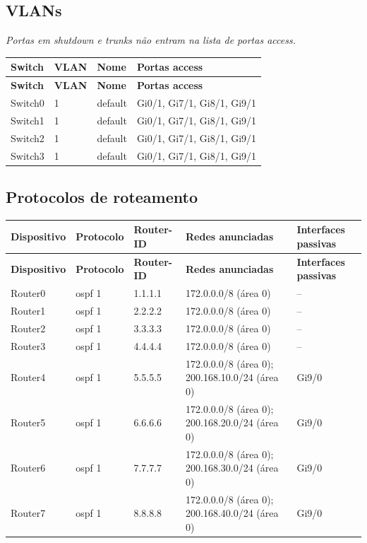 \subsection{VLANs}
\noindent\textit{Portas em shutdown e trunks não entram na lista de portas access.}\par\smallskip
\begingroup\scriptsize\setlength{\tabcolsep}{3pt}
\begin{longtable}{@{}p{}p{}p{}p{}@{}}
\toprule \textbf{Switch} & \textbf{VLAN} & \textbf{Nome} & \textbf{Portas access} \\\midrule\endfirsthead
\toprule \textbf{Switch} & \textbf{VLAN} & \textbf{Nome} & \textbf{Portas access} \\\midrule\endhead
Switch0 & 1 & default & Gi0/1, Gi7/1, Gi8/1, Gi9/1 \\
Switch1 & 1 & default & Gi0/1, Gi7/1, Gi8/1, Gi9/1 \\
Switch2 & 1 & default & Gi0/1, Gi7/1, Gi8/1, Gi9/1 \\
Switch3 & 1 & default & Gi0/1, Gi7/1, Gi8/1, Gi9/1 \\
\bottomrule
\end{longtable}\endgroup

\subsection{Protocolos de roteamento}
\begingroup\scriptsize\setlength{\tabcolsep}{3pt}
\begin{longtable}{@{}p{}p{}p{}p{}p{}@{}}
\toprule \textbf{Dispositivo} & \textbf{Protocolo} & \textbf{Router-ID} & \textbf{Redes anunciadas} & \textbf{Interfaces passivas} \\\midrule\endfirsthead
\toprule \textbf{Dispositivo} & \textbf{Protocolo} & \textbf{Router-ID} & \textbf{Redes anunciadas} & \textbf{Interfaces passivas} \\\midrule\endhead
Router0 & ospf 1 & 1.1.1.1 & 172.0.0.0/8 (área 0) & -- \\
Router1 & ospf 1 & 2.2.2.2 & 172.0.0.0/8 (área 0) & -- \\
Router2 & ospf 1 & 3.3.3.3 & 172.0.0.0/8 (área 0) & -- \\
Router3 & ospf 1 & 4.4.4.4 & 172.0.0.0/8 (área 0) & -- \\
Router4 & ospf 1 & 5.5.5.5 & 172.0.0.0/8 (área 0); 200.168.10.0/24 (área 0) & Gi9/0 \\
Router5 & ospf 1 & 6.6.6.6 & 172.0.0.0/8 (área 0); 200.168.20.0/24 (área 0) & Gi9/0 \\
Router6 & ospf 1 & 7.7.7.7 & 172.0.0.0/8 (área 0); 200.168.30.0/24 (área 0) & Gi9/0 \\
Router7 & ospf 1 & 8.8.8.8 & 172.0.0.0/8 (área 0); 200.168.40.0/24 (área 0) & Gi9/0 \\
\bottomrule
\end{longtable}\endgroup

